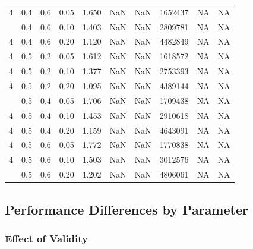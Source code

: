 \documentclass[
]{article}
\begin{document}
\begin{longtable}[t]{rrrrrrrrrr}
4 & 0.4 & 0.6 & 0.05 & 1.650 & NaN & NaN & 1652437 & NA & NA\\
\addlinespace
4 & 0.4 & 0.6 & 0.10 & 1.403 & NaN & NaN & 2809781 & NA & NA\\
4 & 0.4 & 0.6 & 0.20 & 1.120 & NaN & NaN & 4482849 & NA & NA\\
4 & 0.5 & 0.2 & 0.05 & 1.612 & NaN & NaN & 1618572 & NA & NA\\
4 & 0.5 & 0.2 & 0.10 & 1.377 & NaN & NaN & 2753393 & NA & NA\\
4 & 0.5 & 0.2 & 0.20 & 1.095 & NaN & NaN & 4389144 & NA & NA\\
\addlinespace
4 & 0.5 & 0.4 & 0.05 & 1.706 & NaN & NaN & 1709438 & NA & NA\\
4 & 0.5 & 0.4 & 0.10 & 1.453 & NaN & NaN & 2910618 & NA & NA\\
4 & 0.5 & 0.4 & 0.20 & 1.159 & NaN & NaN & 4643091 & NA & NA\\
4 & 0.5 & 0.6 & 0.05 & 1.772 & NaN & NaN & 1770838 & NA & NA\\
4 & 0.5 & 0.6 & 0.10 & 1.503 & NaN & NaN & 3012576 & NA & NA\\
\addlinespace
4 & 0.5 & 0.6 & 0.20 & 1.202 & NaN & NaN & 4806061 & NA & NA\\
\bottomrule
\end{longtable}

\subsection{Performance Differences by
Parameter}\label{performance-differences-by-parameter}

\subsubsection{Effect of Validity}\label{effect-of-validity}
\end{document}
